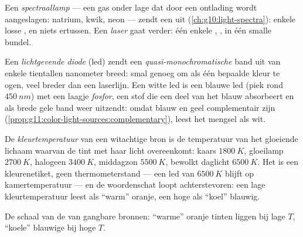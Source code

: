 \begin{definition}\label{def:g11:color-light-sources:lamps}
Een \emph{spectraallamp} --- een gas onder lage 
dat door een ontlading wordt aangeslagen: natrium, kwik, neon --- zendt
een  uit (\cref{ch:g10:light-spectra}): enkele losse
, en niets ertussen. Een \emph{laser} gaat verder:
één enkele , , in één smalle bundel.
\end{definition}

\begin{definition}[Leds]\label{def:g11:color-light-sources:led}
Een \emph{lichtgevende diode} (led) zendt een
\emph{quasi-monochromatische} band uit van
enkele tientallen nanometer breed: smal genoeg om als één bepaalde kleur
te ogen, veel breder dan een laserlijn. Een witte led is een blauwe led
(piek rond $\qty{450}{nm}$) met een laagje
\emph{fosfor}, een stof die een deel van het blauw
absorbeert en als brede gele band weer uitzendt: omdat blauw en geel
complementair zijn (\cref{prop:g11:color-light-sources:complementary}),
leest het mengsel als wit.
\end{definition}

\begin{definition}[Kleurtemperatuur]\label{def:g11:color-light-sources:colortemp}
De \emph{kleurtemperatuur} van een witachtige
bron is de temperatuur van het gloeiende lichaam waarvan de tint met haar
licht overeenkomt: kaars $\qty{1800}{K}$, gloeilamp $\qty{2700}{K}$,
halogeen $\qty{3400}{K}$, middagzon $\qty{5500}{K}$, bewolkt daglicht
$\qty{6500}{K}$. Het is een kleurenetiket, geen thermometerstand --- een
led van $\qty{6500}{K}$ blijft op kamertemperatuur --- en de woordenschat
loopt achterstevoren: een lage kleurtemperatuur leest als ``warm''
oranje, een hoge als ``koel'' blauwig.
\end{definition}

\begin{omfigure}

{\small De schaal van de  van gangbare bronnen:
``warme'' oranje tinten liggen bij lage $T$, ``koele'' blauwige bij hoge
$T$.}
\end{omfigure}

